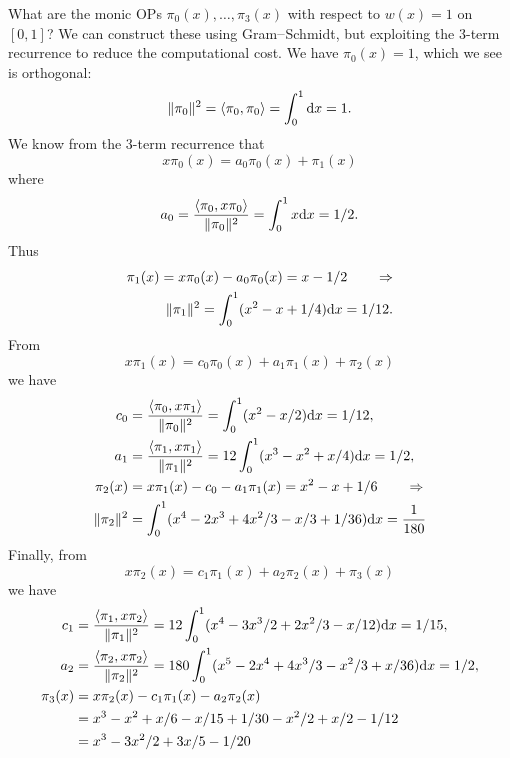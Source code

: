 \begin{example} What are the  monic OPs $\ensuremath{\pi}_0(x),\ensuremath{\ldots},\ensuremath{\pi}_3(x)$ with respect to $w(x) = 1$ on $[0,1]$? We can construct these using Gram\ensuremath{\endash}Schmidt, but exploiting the 3-term recurrence to reduce the computational cost. We have $\ensuremath{\pi}_0(x) = 1$, which we see is orthogonal:
\[
\|\ensuremath{\pi}_0\|^2 = \ensuremath{\langle}\ensuremath{\pi}_0,\ensuremath{\pi}_0\ensuremath{\rangle} = \ensuremath{\int}_0^1 {\rm d} x = 1.
\]
We know from the 3-term recurrence that
\[
x \ensuremath{\pi}_0(x) = a_0 \ensuremath{\pi}_0(x) +  \ensuremath{\pi}_1(x)
\]
where
\[
a_0 = {\ensuremath{\langle}\ensuremath{\pi}_0,x \ensuremath{\pi}_0\ensuremath{\rangle}  \over \|\ensuremath{\pi}_0\|^2} = \ensuremath{\int}_0^1 x {\rm d} x = 1/2.
\]
Thus
\begin{align*}
\ensuremath{\pi}_1(x) = x \ensuremath{\pi}_0(x) - a_0 \ensuremath{\pi}_0(x) = x-1/2 \qquad  \ensuremath{\Rightarrow} \\
\|\ensuremath{\pi}_1\|^2 = \ensuremath{\int}_0^1 (x^2 - x + 1/4) {\rm d} x = 1/12.    
\end{align*}
From
\[
x \ensuremath{\pi}_1(x) = c_0 \ensuremath{\pi}_0(x) + a_1 \ensuremath{\pi}_1(x) +  \ensuremath{\pi}_2(x)
\]
we have
\begin{align*}
c_0 &= {\ensuremath{\langle}\ensuremath{\pi}_0,x \ensuremath{\pi}_1\ensuremath{\rangle}  \over \|\ensuremath{\pi}_0\|^2} = \ensuremath{\int}_0^1 (x^2 - x/2) {\rm d} x = 1/12, \\
a_1 &= {\ensuremath{\langle}\ensuremath{\pi}_1,x \ensuremath{\pi}_1\ensuremath{\rangle}  \over \|\ensuremath{\pi}_1\|^2} = 12 \ensuremath{\int}_0^1 (x^3 - x^2 + x/4) {\rm d} x = 1/2, \\
\ensuremath{\pi}_2(x) &= x \ensuremath{\pi}_1(x) - c_0 - a_1 \ensuremath{\pi}_1(x) = x^2 - x + 1/6 \qquad \ensuremath{\Rightarrow} \\
\|\ensuremath{\pi}_2\|^2 &= \int_0^1 (x^4 - 2x^3 + 4x^2/3 - x/3 + 1/36) {\rm d} x = {1 \over 180}
\end{align*}
Finally, from
\[
x \ensuremath{\pi}_2(x) = c_1 \ensuremath{\pi}_1(x) + a_2 \ensuremath{\pi}_2(x) +  \ensuremath{\pi}_3(x)
\]
we have
\begin{align*}
c_1 &= {\ensuremath{\langle}\ensuremath{\pi}_1,x \ensuremath{\pi}_2\ensuremath{\rangle}  \over \|\ensuremath{\pi}_1\|^2} = 12 \ensuremath{\int}_0^1 (x^4 - 3x^3/2 +2x^2/3 -x/12)  {\rm d} x = 1/15, \\
a_2 &= {\ensuremath{\langle}\ensuremath{\pi}_2,x \ensuremath{\pi}_2\ensuremath{\rangle}  \over \|\ensuremath{\pi}_2\|^2} = 180 \ensuremath{\int}_0^1 (x^5 - 2x^4 +4x^3/3 - x^2/3 + x/36) {\rm d} x = 1/2, \\
\ensuremath{\pi}_3(x) &= x \ensuremath{\pi}_2(x) - c_1 \ensuremath{\pi}_1(x)- a_2 \ensuremath{\pi}_2(x) \ccr 
= x^3 - x^2 + x/6 - x/15 + 1/30 -x^2/2 + x/2 - 1/12 \\
&= x^3 - 3x^2/2 + 3x/5 -1/20
\end{align*}
\end{example}

